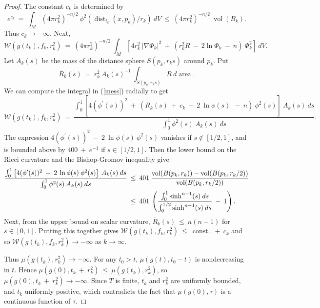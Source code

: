 \documentclass[12pt]{amsart}
\newcommand{\area}{\operatorname{area}}
\newcommand{\const}{\operatorname{const.}}
\newcommand{\dist}{\operatorname{dist}}
\newcommand{\vol}{\operatorname{vol}}
\numberwithin{equation}{section}
\theoremstyle{plain}
\theoremstyle{definition}
\theoremstyle{remark}
\begin{document}
\begin{proof}
The constant $c_k$ is determined by
\begin{equation}
e^{c_k} \: = \: \int_M (4 \pi r_k^2)^{-n/2} \: 
\phi^2(\dist_{t_k}(x, p_k)/r_k) \: dV \: \le \:
(4 \pi r_k^2)^{-n/2} \: 
\vol(B_k).
\end{equation}
Thus $c_k \rightarrow - \infty$.
Next,
\begin{equation} \label{mess}
{\mathcal W}(g(t_k), f_k, r_k^2) \: = \: (4 \pi r_k^2)^{-n/2} \:
\int_M \left[ 4 r_k^2 \: |\nabla \Phi_k|^2 \: + \:
( r_k^2 R \: - \: 2 \ln \Phi_k
\: - \: n ) \: \Phi_k^2 \right] \: dV.
\end{equation}
Let $A_k(s)$ be the mass of the distance sphere $S(p_k, r_k s)$ around $p_k$.
Put 
\begin{equation}
\overline{R}_k(s) \: = \: r_k^{2} \: A_k(s)^{-1} 
\: \int_{S(p_k, r_k s)} R \: d\area. 
\end{equation}
We can compute the integral in (\ref{mess}) radially to get
\begin{equation}
{\mathcal W}(g(t_k), f_k, r_k^2) \: 
= \:  \frac{\int_0^1 \left[ 4 (\phi^\prime(s))^2 \: + \:
(\overline{R}_k(s) \: + \: c_k \: - \: 2 \: \ln \phi(s) \: 
\: - \: n ) \: \phi^2(s) \right] \: A_k(s) \: 
ds}{\int_0^1 \phi^2(s) \: A_k(s) \: ds}.
\end{equation}
The expression 
$4 (\phi^\prime(s))^2 \: - \: 2 \: \ln \phi(s) \: \phi^2(s)$ vanishes
if $s \notin [1/2, 1]$, and is bounded above by $400 \: + \: e^{-1}$ if
$s \in [1/2, 1]$. Then the lower
bound on the Ricci curvature and the Bishop-Gromov
inequality give
\begin{align}
\frac{\int_0^1 \left[ 4 (\phi^\prime(s))^2 \: - \: 2 \: \ln \phi(s) 
\: \phi^2(s) \right] \: A_k(s) \: 
ds}{\int_0^1 \phi^2(s) \: A_k(s) \: ds} \: & \le \: 401 \: 
\frac{\vol(B(p_k, r_k)) - \vol(B(p_k, r_k/2))}{\vol(B(p_k, r_k/2))} \\
& \le \: 401 \: \left( 
\frac{\int_0^1 \sinh^{n-1}(s) 
\: ds}{\int_0^{1/2} \sinh^{n-1}(s) \: ds} \: - \: 1 \right).
\notag
\end{align}
Next, from the upper bound on scalar curvature,
$\overline{R}_k(s) \: \le \: n(n-1)$ for $s \in [0,1]$.
Putting this together gives
${\mathcal W}(g(t_k), f_k, r_k^2) \: \le \: \const \: + \: c_k$ and 
so ${\mathcal W}(g(t_k), f_k, r_k^2) \rightarrow -
\infty$ as $k \rightarrow \infty$.

Thus $\mu(g(t_k), r_k^2) \rightarrow - \infty$. 
For any $t_0>t$, $\mu(g(t), t_0 - t)$ is
nondecreasing in $t$. Hence $\mu(g(0), t_k \: + \: r_k^2) \: \le \:
\mu(g(t_k), r_k^2)$, so $\mu(g(0), t_k \: + \: r_k^2) \rightarrow
- \infty$. Since $T$ is finite, $t_k$ and $r_k^2$ are 
uniformly bounded, 
and $t_k$ uniformly positive,
which
contradicts the fact that $\mu(g(0),\tau)$ is a continuous function of $\tau$.
\end{proof}
\end{document}
